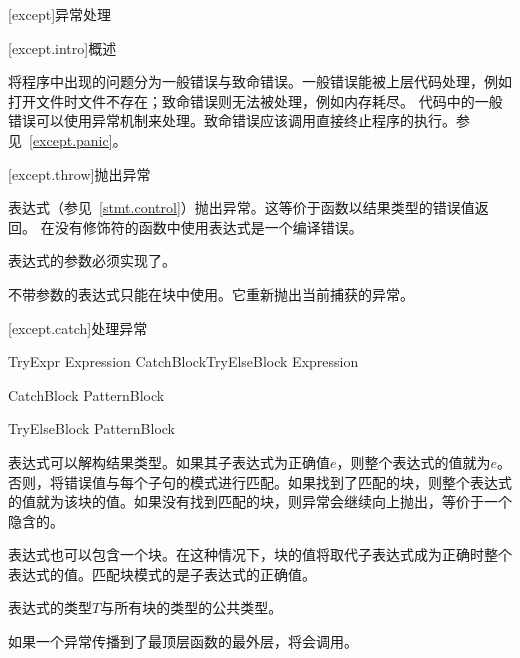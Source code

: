
[except]{异常处理}

[except.intro]{概述}

\pnum
\X 将程序中出现的问题分为一般错误与致命错误。一般错误能被上层代码处理，例如打开文件时文件不存在；致命错误则无法被处理，例如内存耗尽。
代码中的一般错误可以使用异常机制来处理。致命错误应该调用直接终止程序的执行。参见~\ref{except.panic}。

[except.throw]{抛出异常}

\pnum
{}表达式（参见~\ref{stmt.control}）抛出异常。这等价于函数以结果类型的错误值返回。
在没有修饰符的函数中使用表达式是一个编译错误。

\pnum
{}表达式的参数必须实现了。

\pnum
不带参数的表达式只能在块中使用。它重新抛出当前捕获的异常。

[except.catch]{处理异常}

\begin{bnf}{TryExpr}
     Expression CatchBlock\bnfp TryElseBlock\bnfq \br
     Expression
\end{bnf}

\begin{bnf}{CatchBlock}
     Pattern\bnfq Block
\end{bnf}

\begin{bnf}{TryElseBlock}
     Pattern\bnfq Block
\end{bnf}

\pnum
{}表达式可以解构结果类型。如果其子表达式为正确值$e$，则整个表达式的值就为$e$。否则，将错误值与每个子句的模式进行匹配。如果找到了匹配的块，则整个表达式的值就为该块的值。如果没有找到匹配的块，则异常会继续向上抛出，等价于一个隐含的。

\pnum
{}表达式也可以包含一个块。在这种情况下，块的值将取代子表达式成为正确时整个表达式的值。匹配块模式的是子表达式的正确值。

\pnum
{}表达式的类型$T$与所有块的类型的公共类型。

\pnum
如果一个异常传播到了最顶层函数的最外层，将会调用。

